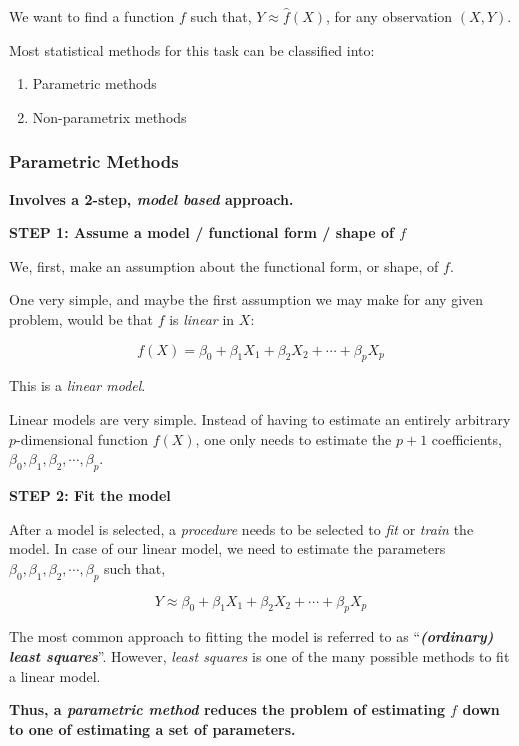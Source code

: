 \documentclass[11pt]{article}
\providecommand{\tightlist}{%
      \setlength{\itemsep}{0pt}\setlength{\parskip}{0pt}}
\begin{document}
We want to find a function \(f\) such that, \(Y \approx \hat{f}(X)\),
for any observation \((X, Y)\).

Most statistical methods for this task can be classified into:

\begin{enumerate}
\def\labelenumi{\arabic{enumi}.}
\tightlist
\item
  Parametric methods
\item
  Non-parametrix methods
\end{enumerate}

    \hypertarget{parametric-methods}{%
\subsubsection{Parametric Methods}\label{parametric-methods}}

\textbf{Involves a 2-step, \emph{model based} approach.}

\textbf{STEP 1: Assume a model / functional form / shape of \(f\)}

We, first, make an assumption about the functional form, or shape, of
\(f\).

One very simple, and maybe the first assumption we may make for any
given problem, would be that \(f\) is \emph{linear} in \(X\):

\[
f(X) = \beta_{0} + \beta_{1}X_{1} + \beta_{2}X_{2} + \cdots + \beta_{p}X_{p}
\]

This is a \emph{linear model}.

Linear models are very simple. Instead of having to estimate an entirely
arbitrary \(p\)-dimensional function \(f(X)\), one only needs to
estimate the \(p + 1\) coefficients,
\(\beta_{0}, \beta_{1}, \beta_{2}, \cdots, \beta_{p}\).

\textbf{STEP 2: Fit the model}

After a model is selected, a \emph{procedure} needs to be selected to
\emph{fit} or \emph{train} the model. In case of our linear model, we
need to estimate the parameters
\(\beta_{0}, \beta_{1}, \beta_{2}, \cdots, \beta_{p}\) such that,

\[
Y \approx \beta_{0} + \beta_{1}X_{1} + \beta_{2}X_{2} + \cdots + \beta_{p}X_{p}
\]

The most common approach to fitting the model is referred to as
``\textbf{\emph{(ordinary) least squares}}''. However, \emph{least
squares} is one of the many possible methods to fit a linear model.

\textbf{Thus, a \emph{parametric method} reduces the problem of
estimating \(f\) down to one of estimating a set of parameters.}
\end{document}

